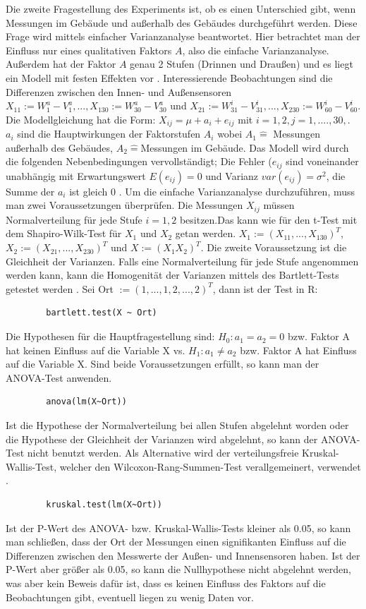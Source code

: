 \documentclass[ ngerman, fontsize= 12pt, paper=a4, headings=big, titlepage=true]{article}
\begin{document}
	Die zweite Fragestellung des Experiments ist, ob es einen Unterschied gibt, wenn Messungen im Gebäude und außerhalb des Gebäudes durchgeführt werden. Diese Frage wird mittels einfacher Varianzanalyse beantwortet. Hier betrachtet man der Einfluss nur eines qualitativen Faktors $A $, also die einfache Varianzanalyse. Außerdem hat der Faktor $A $ genau 2 Stufen (Drinnen und Draußen) und es liegt ein Modell mit festen Effekten vor \cite{3}. Interessierende Beobachtungen sind  die Differenzen zwischen den Innen- und Außensensoren $X_{11} := W^a_1 - V^a_1, ..., X_{1 30} := W^a_{30} - V^a_{30} $ und $X_{21} := W^i_{31} - V^i_{31}, ..., X_{2 30} := W^i_{60} - V^i_{60}  $. \\ Die Modellgleichung hat die Form: $ X_{ij} = \mu + a_i + e_{ij}  $ mit $ i = 1, 2, j = 1,...., 30, $. $a_i $ sind die Hauptwirkungen der Faktorstufen $A_i $ wobei $ A_1 \hat{=} $ Messungen außerhalb des Gebäudes, $ A_2 \hat{=} $Messungen im Gebäude. Das Modell wird durch die folgenden Nebenbedingungen vervollständigt; Die Fehler ($e_{ij} $ sind voneinander unabhängig mit Erwartungswert $E(e_{ij}) = 0 $ und Varianz $var(e_{ij} ) = \sigma^2 $, die Summe der $a_i $ ist gleich 0 \cite{3}. Um die einfache Varianzanalyse durchzuführen, muss man zwei Voraussetzungen überprüfen. Die Messungen $X_{ij} $  müssen Normalverteilung für jede Stufe $i = 1, 2 $ besitzen.Das kann wie für den t-Test mit dem Shapiro-Wilk-Test für $X_1 $ und $X_2 $ getan werden. $X_1 := (X_{11}, ..., X_{1 30})^T $, $ X_2 := (X_{21}, ..., X_{2 30})^T $ und $X := (X_1 X_2)^T $. Die zweite Voraussetzung ist die Gleichheit der Varianzen. Falls eine Normalverteilung für jede Stufe angenommen werden kann, kann die Homogenität der Varianzen mittels des Bartlett-Tests getestet werden  \cite{4}. Sei Ort $:= (1,...,1,2,...,2)^T $, dann ist der Test in R: \begin{lstlisting}
		bartlett.test(X ~ Ort)
	\end{lstlisting}
	Die Hypothesen für die Hauptfragestellung sind: $ H_0: a_1 = a_2 = 0 $ bzw. Faktor A hat keinen Einfluss auf die Variable X  vs.  $H_1: a_1 \neq a_2 $ bzw. Faktor A hat Einfluss auf die Variable X. Sind beide Voraussetzungen erfüllt, so kann man der ANOVA-Test anwenden.\begin{lstlisting}
		anova(lm(X~Ort))
	\end{lstlisting}  
	Ist die Hypothese der Normalverteilung bei allen Stufen abgelehnt worden oder die Hypothese der Gleichheit der Varianzen wird abgelehnt, so kann der ANOVA-Test nicht benutzt werden. Als Alternative wird der verteilungsfreie Kruskal-Wallis-Test, welcher den Wilcoxon-Rang-Summen-Test verallgemeinert, verwendet \cite{4}.
	\begin{lstlisting}
		kruskal.test(lm(X~Ort))
	\end{lstlisting}
	Ist der P-Wert des ANOVA- bzw. Kruskal-Wallis-Tests kleiner als 0.05, so kann man schließen, dass der Ort der Messungen einen signifikanten Einfluss auf die Differenzen zwischen den Messwerte der Außen- und Innensensoren haben. Ist der P-Wert aber größer als 0.05, so kann die Nullhypothese nicht abgelehnt werden, was aber kein Beweis dafür ist, dass es keinen Einfluss des Faktors auf die Beobachtungen gibt, eventuell liegen zu wenig Daten vor.
\end{document}
